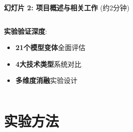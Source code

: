 \documentclass[10pt]{beamer}
\begin{document}
\begin{frame}{\textbf{幻灯片 2: 项目概述与相关工作} (约2分钟)}
{\begin{columns}[T]
\begin{column}{0.5\textwidth}
        \vspace{0.2em}
        \textbf{实验验证深度}:
        \begin{itemize}
            \item \textbf{21个模型变体}全面评估
            \item \textbf{4大技术类型}系统对比
            \item \textbf{多维度消融}实验设计
        \end{itemize}
    \end{column}
\end{columns}
}

\end{frame}

\section{实验方法}
\end{document}
